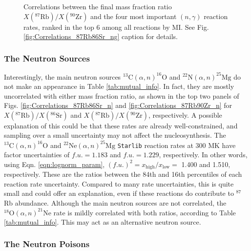 \begin{figure}[!p]
\begin{subfigure}[b]{0.495\textwidth}
\end{subfigure}
\caption{\label{fig:Correlations_87Rb90Zr_ng}Correlations between the final mass fraction ratio $X(^{87}\mathrm{Rb})/X(^{90}\mathrm{Zr})$ and the four most important $(n,\gamma)$ reaction rates, ranked in the top 6 among all reactions by MI. See Fig. \ref{fig:Correlations_87Rb86Sr_ng} caption for details.}
\end{figure}

\subsubsection{The Neutron Sources}

Interestingly, the main neutron sources $^{13}\mathrm{C}(\alpha,n)^{16}\mathrm{O}$ and $^{22}\mathrm{N}(\alpha,n)^{25}\mathrm{Mg}$ do not make an appearance in Table \ref{tab:mutual_info}. In fact, they are mostly uncorrelated with either mass fraction ratio, as shown in the top two panels of Figs. \ref{fig:Correlations_87Rb86Sr_n} and \ref{fig:Correlations_87Rb90Zr_n} for $X(^{87}\mathrm{Rb})/X(^{86}\mathrm{Sr})$ and $X(^{87}\mathrm{Rb})/X(^{90}\mathrm{Zr})$, respectively. A possible explanation of this could be that these rates are already well-constrained, and sampling over a small uncertainty may not affect the nucleosynthesis. The $^{13}\mathrm{C}(\alpha,n)^{16}\mathrm{O}$ and $^{22}\mathrm{Ne}(\alpha,n)^{25}\mathrm{Mg}$ \texttt{Starlib} reaction rates at 300 MK have factor uncertainties of $f.u. = 1.183$ and $f.u. = 1.229$, respectively. In other words, using Eqn. \ref{eqn:lognorm_param}, $(f.u.)^{2} = x_{\mathrm{high}}/x_{\mathrm{low}} =$ 1.400 and 1.510, respectively. These are the ratios between the 84th and 16th percentiles of each reaction rate uncertainty. Compared to many rate uncertainties, this is quite small and could offer an explanation, even if these reactions do contribute to $^{87}$Rb abundance. Although the main neutron sources are not correlated, the $^{18}\mathrm{O}(\alpha,n)^{21}\mathrm{Ne}$ rate is mildly correlated with both ratios, according to Table \ref{tab:mutual_info}. This may act as an alternative neutron source.

\subsubsection{The Neutron Poisons}

